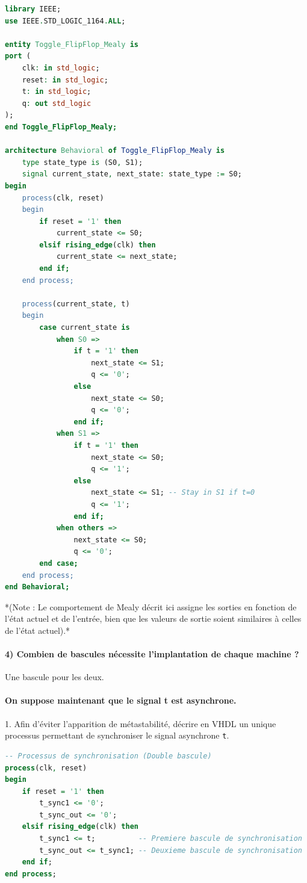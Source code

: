 \documentclass[11pt,a4paper]{article}
\begin{document}
\begin{lstlisting}[language=VHDL]
library IEEE;
use IEEE.STD_LOGIC_1164.ALL; 

entity Toggle_FlipFlop_Mealy is 
port (
    clk: in std_logic;
    reset: in std_logic;
    t: in std_logic;
    q: out std_logic
);
end Toggle_FlipFlop_Mealy; 

architecture Behavioral of Toggle_FlipFlop_Mealy is 
    type state_type is (S0, S1);
    signal current_state, next_state: state_type := S0; 
begin 
    process(clk, reset) 
    begin
        if reset = '1' then 
            current_state <= S0;
        elsif rising_edge(clk) then 
            current_state <= next_state; 
        end if;
    end process; 

    process(current_state, t) 
    begin 
        case current_state is 
            when S0 => 
                if t = '1' then 
                    next_state <= S1;
                    q <= '0'; 
                else 
                    next_state <= S0;
                    q <= '0'; 
                end if; 
            when S1 => 
                if t = '1' then 
                    next_state <= S0;
                    q <= '1'; 
                else 
                    next_state <= S1; -- Stay in S1 if t=0
                    q <= '1';
                end if;
            when others =>
                next_state <= S0;
                q <= '0';
        end case;
    end process;
end Behavioral;
\end{lstlisting}
*(Note : Le comportement de Mealy décrit ici assigne les sorties en fonction de l'état actuel et de l'entrée, bien que les valeurs de sortie soient similaires à celles de l'état actuel).*

\paragraph{4) Combien de bascules nécessite l'implantation de chaque machine ?}
Une bascule pour les deux.

\paragraph{On suppose maintenant que le signal t est asynchrone.}
1. Afin d'éviter l'apparition de métastabilité, décrire en VHDL un unique processus permettant de synchroniser le signal asynchrone \texttt{t}.

\begin{lstlisting}[language=VHDL]
-- Processus de synchronisation (Double bascule)
process(clk, reset)
begin
    if reset = '1' then
        t_sync1 <= '0';
        t_sync_out <= '0';
    elsif rising_edge(clk) then
        t_sync1 <= t;          -- Premiere bascule de synchronisation
        t_sync_out <= t_sync1; -- Deuxieme bascule de synchronisation
    end if;
end process;
\end{lstlisting}
\end{document}
